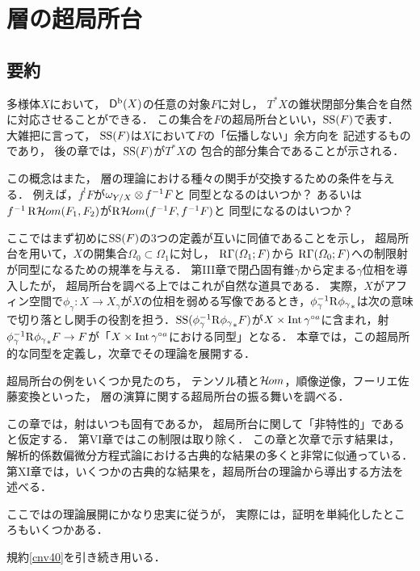 \chapter{層の超局所台}
\section*{要約}
多様体\(X\)において，
\(\mathop{\mathsf{D}^\mathrm{b}}\nolimits(X)\)の任意の対象\(F\)に対し，
\(T^{\ast}X\)の錐状閉部分集合を自然に対応させることができる．
この集合を\(F\)の超局所台といい，\(\mathop{\mathrm{SS}}\nolimits(F)\)で表す．
大雑把に言って，
\(\mathop{\mathrm{SS}}\nolimits(F)\)は\(X\)において\(F\)の「伝播しない」余方向を
記述するものであり，
後の章では，\(\mathop{\mathrm{SS}}\nolimits(F)\)が\(T^{\ast}X\)の
包合的部分集合であることが示される．

この概念はまた，
層の理論における種々の関手が交換するための条件を与える．
例えば，\(f^{!}F\)が\(\omega_{Y/X}\tens[]f^{-1}F\)と
同型となるのはいつか？
あるいは\(f^{-1}\mathop{\mathrm{R}\hspace{-1.5pt}\mathop{\mathcal{H}\hspace{-0.5pt}om}\nolimits}\nolimits(F_1,F_2)\)が\(\mathop{\mathrm{R}\hspace{-1.5pt}\mathop{\mathcal{H}\hspace{-0.5pt}om}\nolimits}\nolimits(f^{-1}F,f^{-1}F)\)と
同型になるのはいつか？

ここではまず初めに\(\mathop{\mathrm{SS}}\nolimits(F)\)の3つの定義が互いに同値であることを示し，
超局所台を用いて，\(X\)の開集合\(\varOmega_0\subset\varOmega_1\)に対し，
\(\mathop{\mathrm{R}\hspace{-0pt}\Gamma}\nolimits(\varOmega_1;F)\)から
\(\mathop{\mathrm{R}\hspace{-0pt}\Gamma}\nolimits(\varOmega_0;F)\)への制限射が同型になるための規準を与える．
第III章で閉凸固有錐\(\gamma\)から定まる\(\gamma\)位相を導入したが，
超局所台を調べる上ではこれが自然な道具である．
実際，\(X\)がアフィン空間で\(
    \phi_{\gamma}\colon X\to X_{\gamma}
\)が\(X\)の位相を弱める写像であるとき，\(
    \phi_{\gamma}^{-1}\mathrm{R}{{\phi_{\gamma}}_{\ast}}
\)は次の意味で切り落とし関手の役割を担う．\(
    \mathop{\mathrm{SS}}\nolimits(\phi_{\gamma}^{-1}\mathrm{R}{{\phi_{\gamma}}_{\ast}}F)
\)が\(X\times\mathop{\mathrm{Int}}\nolimits\gamma^{\circ a}\)に含まれ，射\(
    \phi_{\gamma}^{-1}\mathrm{R}{{\phi_{\gamma}}_{\ast}}F\to F
\)が「\(X\times\mathop{\mathrm{Int}}\nolimits\gamma^{\circ a}\)における同型」となる．
本章では，この超局所的な同型を定義し，次章でその理論を展開する．

超局所台の例をいくつか見たのち，
テンソル積と\(\mathop{\mathcal{H}\hspace{-0.5pt}om}\nolimits\)，順像逆像，フーリエ佐藤変換といった，
層の演算に関する超局所台の振る舞いを調べる．

この章では，射はいつも固有であるか，
超局所台に関して「非特性的」であると仮定する．
第VI章ではこの制限は取り除く．
この章と次章で示す結果は，
解析的係数偏微分方程式論における古典的な結果の多くと非常に似通っている．
第XI章では，いくつかの古典的な結果を，超局所台の理論から導出する方法を述べる．

ここでは\cite{KS85}の理論展開にかなり忠実に従うが，
実際には，証明を単純化したところもいくつかある．

規約\ref{cnv40}を引き続き用いる．

